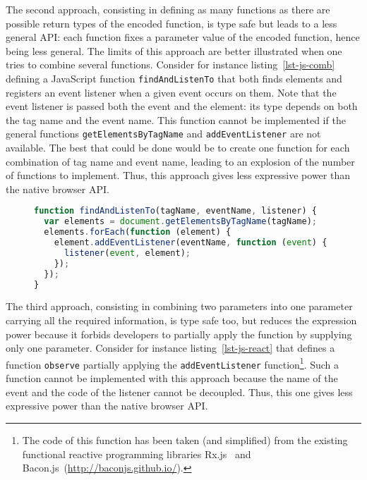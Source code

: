 \documentclass{llncs}
\newcommand{\jscode}[1]{\lstinline[language=JavaScript]|#1|}
\begin{document}
The second approach, consisting in defining as many functions as there are possible return types of the encoded function, is type safe but leads to a less general API: each function fixes a parameter value of the encoded function, hence being less general. The limits of this approach are better illustrated when one tries to combine several functions. Consider for instance listing~\ref{lst-js-comb} defining a JavaScript function \jscode{findAndListenTo} that both finds elements and registers an event listener when a given event occurs on them. Note that the event listener is passed both the event and the element: its type depends on both the tag name and the event name. This function cannot be implemented if the general functions \jscode{getElementsByTagName} and \jscode{addEventListener} are not available. The best that could be done would be to create one function for each combination of tag name and event name, leading to an explosion of the number of functions to implement. Thus, this approach gives less 
expressive power than the native browser API.

\begin{figure}
\begin{lstlisting}[label=lst-js-comb,language=JavaScript,caption={Combination of use of \jscode{getElementsByTagName} and \jscode{addEventListener}}]
function findAndListenTo(tagName, eventName, listener) {
  var elements = document.getElementsByTagName(tagName);
  elements.forEach(function (element) {
    element.addEventListener(eventName, function (event) {
      listener(event, element);
    });
  });
}
\end{lstlisting}
\end{figure}

The third approach, consisting in combining two parameters into one parameter carrying all the required information, is type safe too, but reduces the expression power because it forbids developers to partially apply the function by supplying only one parameter. Consider for instance listing~\ref{lst-js-react} that defines a function \jscode{observe} partially applying the \jscode{addEventListener} function\footnote{The code of this function has been taken (and simplified) from the existing functional reactive programming libraries Rx.js~\cite{liberty2011reactive} and Bacon.js~(\href{http://baconjs.github.io/}{http://baconjs.github.io/}).}. Such a function cannot be implemented with this approach because the name of the event and the code of the listener cannot be decoupled. Thus, this one gives less expressive power than the native browser API.
\end{document}
